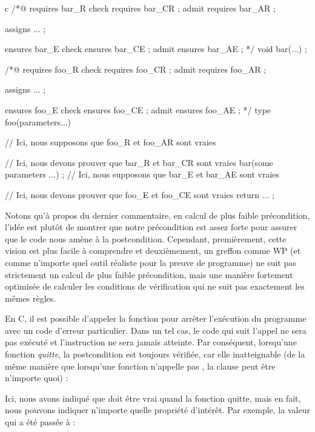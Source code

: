 \begin{CodeBlock}{c}
  /*@       requires bar_R
      check requires bar_CR ;
      admit requires bar_AR ;

      assigns ... ;

            ensures bar_E
      check ensures bar_CE ;
      admit ensures bar_AE ;
  */
  void bar(...) ;

  /*@       requires foo_R
      check requires foo_CR ;
      admit requires foo_AR ;

      assigns ... ;

            ensures foo_E
      check ensures foo_CE ;
      admit ensures foo_AE ;
  */
  type foo(parameters...){
    // Ici, nous supposons que foo_R et foo_AR sont vraies


    // Ici, nous devons prouver que bar_R et bar_CR sont vraies
    bar(some parameters ...) ;
    // Ici, nous supposons que bar_E et bar_AE sont vraies


    // Ici, nous devons prouver que foo_E et foo_CE sont vraies
    return ... ;
  }
  \end{CodeBlock}


Notons qu'à propos du dernier commentaire, en calcul de plus faible précondition,
l'idée est plutôt de montrer que notre précondition est assez forte pour assurer
que le code nous amène à la postcondition. Cependant, premièrement, cette vision
est plus facile à comprendre et deuxièmement, un greffon comme WP (et comme n'importe
quel outil réaliste pour la preuve de programme) ne suit pas strictement un calcul
de plus faible précondition, mais une manière fortement optimisée de calculer les
conditions de vérification qui ne suit pas exactement les mêmes règles.




En C, il est possible d'appeler la fonction  pour arrêter
l'exécution du programme avec un code d'erreur particulier. Dans un tel cas, le
code qui suit l'appel ne sera pas exécuté et l'instruction 
ne sera jamais atteinte. Par conséquent, lorsqu'une fonction \textit{quitte},
la postcondition est toujours vérifiée, car elle inatteignable (de la même
manière que lorsqu'une fonction n'appelle pas , la clause
 peut être n'importe quoi) :




Ici, nous avons indiqué que  doit être vrai
quand la fonction quitte, mais en fait, nous pouvons indiquer n'importe quelle
propriété d'intérêt. Par exemple, la valeur qui a été passée à
 :


